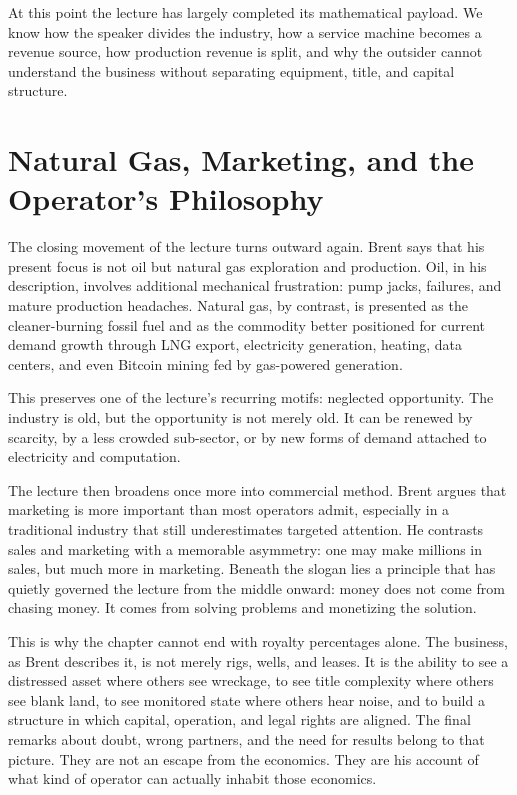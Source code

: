 At this point the lecture has largely completed its mathematical payload. We know how the speaker divides the industry, how a service machine becomes a revenue source, how production revenue is split, and why the outsider cannot understand the business without separating equipment, title, and capital structure.

\section{Natural Gas, Marketing, and the Operator's Philosophy}

The closing movement of the lecture turns outward again. Brent says that his present focus is not oil but natural gas exploration and production. Oil, in his description, involves additional mechanical frustration: pump jacks, failures, and mature production headaches. Natural gas, by contrast, is presented as the cleaner-burning fossil fuel and as the commodity better positioned for current demand growth through LNG export, electricity generation, heating, data centers, and even Bitcoin mining fed by gas-powered generation.

This preserves one of the lecture's recurring motifs: neglected opportunity. The industry is old, but the opportunity is not merely old. It can be renewed by scarcity, by a less crowded sub-sector, or by new forms of demand attached to electricity and computation.

The lecture then broadens once more into commercial method. Brent argues that marketing is more important than most operators admit, especially in a traditional industry that still underestimates targeted attention. He contrasts sales and marketing with a memorable asymmetry: one may make millions in sales, but much more in marketing. Beneath the slogan lies a principle that has quietly governed the lecture from the middle onward: money does not come from chasing money. It comes from solving problems and monetizing the solution.

This is why the chapter cannot end with royalty percentages alone. The business, as Brent describes it, is not merely rigs, wells, and leases. It is the ability to see a distressed asset where others see wreckage, to see title complexity where others see blank land, to see monitored state where others hear noise, and to build a structure in which capital, operation, and legal rights are aligned. The final remarks about doubt, wrong partners, and the need for results belong to that picture. They are not an escape from the economics. They are his account of what kind of operator can actually inhabit those economics.

